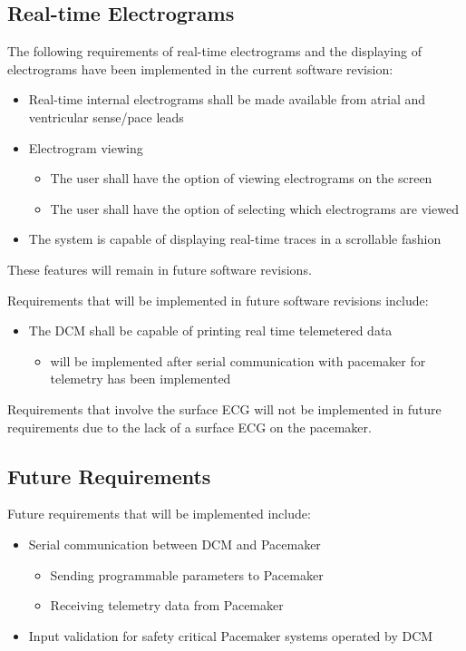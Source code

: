 \documentclass[12pt]{article}
\begin{document}
\subsection{Real-time Electrograms}
The following requirements of real-time electrograms and the displaying of electrograms have been implemented in the current software revision:
\begin{itemize}
    \item Real-time internal electrograms shall be made available from atrial and ventricular sense/pace leads
    \item Electrogram viewing
    \begin{itemize}
        \item The user shall have the option of viewing electrograms on the screen
        \item The user shall have the option of selecting which electrograms are viewed
    \end{itemize}
    \item The system is capable of displaying real-time traces in a scrollable fashion
\end{itemize}
These features will remain in future software revisions. 

Requirements that will be implemented in future software revisions include:
\begin{itemize}
    \item The DCM shall be capable of printing real time telemetered data
    \begin{itemize}
        \item will be implemented after serial communication with pacemaker for telemetry has been implemented
    \end{itemize}
\end{itemize}

Requirements that involve the surface ECG will not be implemented in future requirements due to the lack of a surface ECG on the pacemaker.

\subsection{Future Requirements}
Future requirements that will be implemented include:
\begin{itemize}
    \item Serial communication between DCM and Pacemaker
    \begin{itemize}
        \item Sending programmable parameters to Pacemaker
        \item Receiving telemetry data from Pacemaker
    \end{itemize}
    \item Input validation for safety critical Pacemaker systems operated by DCM
\end{itemize}
\end{document}
